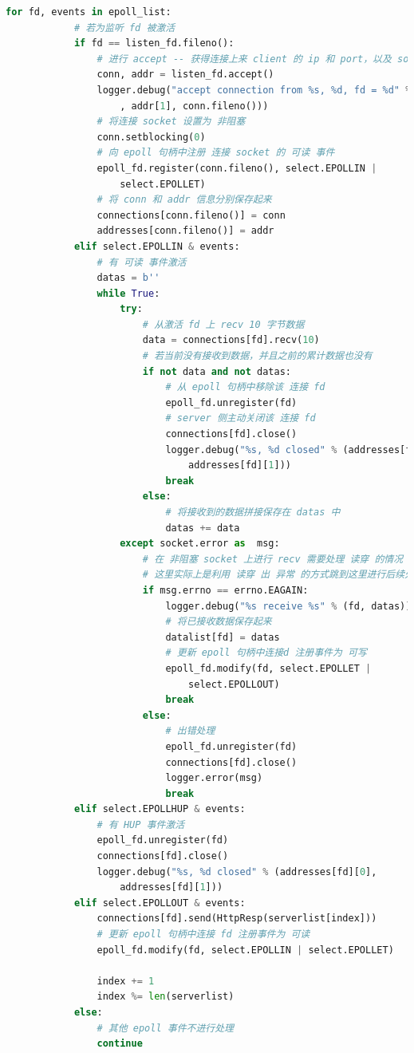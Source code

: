 \documentclass{article}
\begin{document}
\begin{lstlisting}[language=Python]
        for fd, events in epoll_list:
            # 若为监听 fd 被激活
            if fd == listen_fd.fileno():
                # 进行 accept -- 获得连接上来 client 的 ip 和 port，以及 socket 句柄
                conn, addr = listen_fd.accept()
                logger.debug("accept connection from %s, %d, fd = %d" % (addr[0]
                    , addr[1], conn.fileno()))
                # 将连接 socket 设置为 非阻塞
                conn.setblocking(0)
                # 向 epoll 句柄中注册 连接 socket 的 可读 事件
                epoll_fd.register(conn.fileno(), select.EPOLLIN | 
                    select.EPOLLET)
                # 将 conn 和 addr 信息分别保存起来
                connections[conn.fileno()] = conn
                addresses[conn.fileno()] = addr
            elif select.EPOLLIN & events:
                # 有 可读 事件激活
                datas = b''
                while True:
                    try:
                        # 从激活 fd 上 recv 10 字节数据
                        data = connections[fd].recv(10)
                        # 若当前没有接收到数据，并且之前的累计数据也没有
                        if not data and not datas:
                            # 从 epoll 句柄中移除该 连接 fd
                            epoll_fd.unregister(fd)
                            # server 侧主动关闭该 连接 fd
                            connections[fd].close()
                            logger.debug("%s, %d closed" % (addresses[fd][0], 
                                addresses[fd][1]))
                            break
                        else:
                            # 将接收到的数据拼接保存在 datas 中
                            datas += data
                    except socket.error as  msg:
                        # 在 非阻塞 socket 上进行 recv 需要处理 读穿 的情况
                        # 这里实际上是利用 读穿 出 异常 的方式跳到这里进行后续处理
                        if msg.errno == errno.EAGAIN:
                            logger.debug("%s receive %s" % (fd, datas))
                            # 将已接收数据保存起来
                            datalist[fd] = datas
                            # 更新 epoll 句柄中连接d 注册事件为 可写
                            epoll_fd.modify(fd, select.EPOLLET | 
                                select.EPOLLOUT)
                            break
                        else:
                            # 出错处理
                            epoll_fd.unregister(fd)
                            connections[fd].close()
                            logger.error(msg)
                            break
            elif select.EPOLLHUP & events:
                # 有 HUP 事件激活
                epoll_fd.unregister(fd)
                connections[fd].close()
                logger.debug("%s, %d closed" % (addresses[fd][0], 
                    addresses[fd][1]))
            elif select.EPOLLOUT & events:
                connections[fd].send(HttpResp(serverlist[index]))
                # 更新 epoll 句柄中连接 fd 注册事件为 可读
                epoll_fd.modify(fd, select.EPOLLIN | select.EPOLLET)

                index += 1
                index %= len(serverlist)
            else:
                # 其他 epoll 事件不进行处理
                continue
        
\end{lstlisting}
\end{document}

